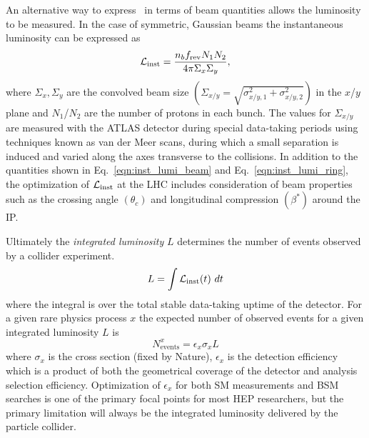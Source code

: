 An alternative way to express \InstLumi\ in terms of beam quantities allows the luminosity to be measured\cite{Grafstrom:2015foa}. In the case of symmetric, Gaussian beams the instantaneous luminosity can be expressed as
\begin{equation}
\mathcal{L}_{\mathrm{inst}} = \frac{n_b f_{\mathrm{rev}} N_1 N_2}{4\pi \Sigma_x \Sigma_y},
\label{eqn:inst_lumi_beam}
\end{equation}
where $\Sigma_x, \Sigma_y$ are the convolved beam size $\left(\Sigma_{x/y} = \sqrt{\sigma_{x/y,1}^2 + \sigma_{x/y,2}^2}\right)$ in the $x$/$y$ plane and $N_1$/$N_2$ are the number of protons in each bunch.
The values for $\Sigma_{x/y}$ are measured with the ATLAS detector during special data-taking periods \cite{ATLAS-CONF-2019-021} using techniques known as van der Meer scans, during which a small separation is induced and varied along the axes transverse to the collisions. In addition to the quantities shown in Eq.~\ref{eqn:inst_lumi_beam} and Eq.~\ref{eqn:inst_lumi_ring}, the optimization of $\mathcal{L}_{\mathrm{inst}}$ at the LHC includes consideration of beam properties such as the crossing angle $(\theta_c)$ and longitudinal compression $(\beta^*)$ around the IP.

Ultimately the \textit{integrated luminosity} $L$ determines the number of events observed by a collider experiment.
\begin{equation}
L = \int \mathcal{L}_{\mathrm{inst}}(t)\ dt
\label{eqn:integrated_lumi}
\end{equation}
where the integral is over the total stable data-taking uptime of the detector.
For a given rare physics process $x$ the expected number of observed events for a given integrated luminosity $L$ is
\begin{equation}
N_{\mathrm{events}}^{x} = \epsilon_x \sigma_x L
\label{eqn:nobs_events}
\end{equation}
where $\sigma_x$ is the cross section (fixed by Nature), $\epsilon_x$ is the detection efficiency which is a product of both the geometrical coverage of the detector and analysis selection efficiency.
Optimization of $\epsilon_x$ for both SM measurements and BSM searches is one of the primary focal points for most HEP researchers, but the primary limitation will always be the integrated luminosity delivered by the particle collider.

